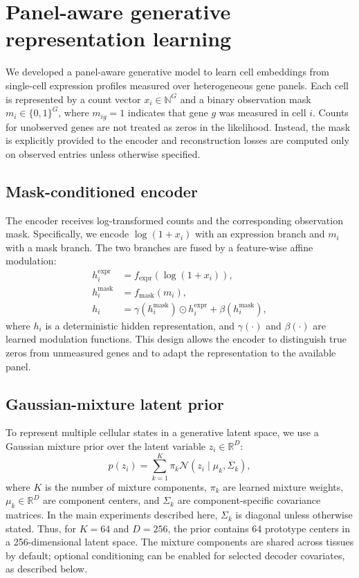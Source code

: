 \section{Panel-aware generative representation learning}

We developed a panel-aware generative model to learn cell embeddings from single-cell
expression profiles measured over heterogeneous gene panels. Each cell is represented
by a count vector \(x_i \in \mathbb{N}^{G}\) and a binary observation mask
\(m_i \in \{0,1\}^{G}\), where \(m_{ig}=1\) indicates that gene \(g\) was measured in
cell \(i\). Counts for unobserved genes are not treated as zeros in the likelihood.
Instead, the mask is explicitly provided to the encoder and reconstruction losses are
computed only on observed entries unless otherwise specified.

\subsection{Mask-conditioned encoder}

The encoder receives log-transformed counts and the corresponding observation mask.
Specifically, we encode \(\log(1+x_i)\) with an expression branch and \(m_i\) with a
mask branch. The two branches are fused by a feature-wise affine modulation:
\begin{align}
    h^{\mathrm{expr}}_i &= f_{\mathrm{expr}}(\log(1+x_i)), \\
    h^{\mathrm{mask}}_i &= f_{\mathrm{mask}}(m_i), \\
    h_i &= \gamma(h^{\mathrm{mask}}_i) \odot h^{\mathrm{expr}}_i
           + \beta(h^{\mathrm{mask}}_i),
\end{align}
where \(h_i\) is a deterministic hidden representation, and
\(\gamma(\cdot)\) and \(\beta(\cdot)\) are learned modulation functions. This design
allows the encoder to distinguish true zeros from unmeasured genes and to adapt the
representation to the available panel.

\subsection{Gaussian-mixture latent prior}

To represent multiple cellular states in a generative latent space, we use a Gaussian
mixture prior over the latent variable \(z_i \in \mathbb{R}^{D}\):
\begin{equation}
    p(z_i) = \sum_{k=1}^{K} \pi_k
    \mathcal{N}\left(z_i \mid \mu_k, \Sigma_k\right),
\end{equation}
where \(K\) is the number of mixture components, \(\pi_k\) are learned mixture
weights, \(\mu_k \in \mathbb{R}^{D}\) are component centers, and \(\Sigma_k\) are
component-specific covariance matrices. In the main experiments described here,
\(\Sigma_k\) is diagonal unless otherwise stated. Thus, for \(K=64\) and
\(D=256\), the prior contains 64 prototype centers in a 256-dimensional latent
space. The mixture components are shared across tissues by default; optional
conditioning can be enabled for selected decoder covariates, as described below.

